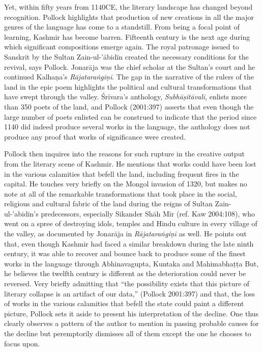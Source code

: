 Yet, within fifty years from 1140CE, the literary landscape has changed beyond recognition. Pollock highlights that production of new creations in all the major genres of the language has come to a standstill. From being a focal point of learning, Kashmir has become barren. Fifteenth century is the next age during which significant compositions emerge again. The royal patronage issued to Sanskrit by the Sultan Zain-ul-’ābidīn created the necessary conditions for the revival, says Pollock. Jonarāja was the chief scholar at the Sultan’s court and he continued Kalhaṇa’s {\sl Rājataraṅgiṇī}. The gap in the narrative of the rulers of the land in the epic poem highlights the political and cultural transformations that have swept through the valley. Śrīvara’s anthology, {\sl Subhāṣitāvalī}, enlists more than 350 poets of the land, and Pollock (2001:397) asserts that even though the large number of poets enlisted can be construed to indicate that the period since 1140 did indeed produce several works in the language, the anthology does not produce any proof that works of significance were created.

Pollock then inquires into the reasons for such rupture in the creative output from the literary scene of Kashmir. He mentions that works could have been lost in the various calamities that befell the land, including frequent fires in the capital. He touches very briefly on the Mongol invasion of 1320, but makes no note at all of the remarkable transformations that took place in the social, religious and cultural fabric of the land during the reigns of Sultan Zain-ul-'abidin’s predecessors, especially Sikander Shāh Mīr (ref. Kaw 2004:108), who went on a spree of destroying idols, temples and Hindu culture in every village of the valley, as documented by Jonarāja in {\sl Rājataraṅgiṇī} as well. He points out that, even though Kashmir had faced a similar breakdown during the late ninth century, it was able to recover and bounce back to produce some of the finest works in the language through Abhinavagupta, Kuntaka and Mahimabhaṭṭa But, he believes the twelfth century is different as the deterioration could never be reversed. Very briefly admitting that “the possibility exists that this picture of literary collapse is an artifact of our data,” (Pollock 2001:397) and that, the loss of works in the various calamities that befell the state could paint a different picture, Pollock sets it aside to present his interpretation of the decline. One thus clearly observes a pattern of the author to mention in passing probable causes for the decline but peremptorily dismisses all of them except the one he chooses to focus upon.

